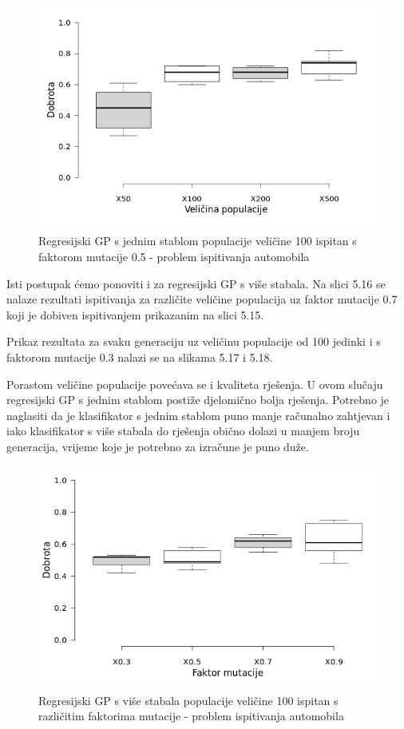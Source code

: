 \documentclass[times, utf8, zavrsni]{fer}
\begin{document}
\begin{figure}[htb]
\centering
\includegraphics[scale=0.5]{grafovi/boxplotCarS}
\caption{Regresijski GP s jednim stablom populacije veličine 100 ispitan s faktorom mutacije 0.5 - problem ispitivanja automobila}
\end{figure}




Isti postupak ćemo ponoviti i za regresijski GP s više stabala. Na slici 5.16 se nalaze rezultati ispitivanja za različite veličine populacija uz faktor mutacije 0.7 koji je dobiven ispitivanjem prikazanim na slici 5.15.

Prikaz rezultata za svaku generaciju uz veličinu populacije od 100 jedinki i s faktorom mutacije 0.3 nalazi se na slikama 5.17 i 5.18.



Porastom veličine populacije povećava se i kvaliteta rješenja. U ovom slučaju regresijski GP s jednim stablom postiže djelomično bolja rješenja. Potrebno je naglasiti da je klasifikator s jednim stablom puno manje računalno zahtjevan i iako klasifikator s više stabala do rješenja obično dolazi u manjem broju generacija, vrijeme koje je potrebno za izračune je puno duže.

\begin{figure}[htb]
\centering
\includegraphics[scale=0.5]{grafovi/boxplotCarMTest}
\caption{Regresijski GP s više stabala populacije veličine 100 ispitan s različitim faktorima mutacije - problem ispitivanja automobila}
\end{figure}
\end{document}
